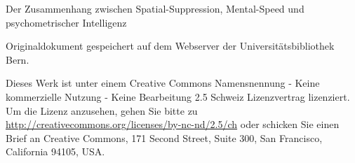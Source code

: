 \documentclass[11pt, twoside, a4paper]{book}		%
\begin{document}
\frontmatter		%


\begin{titlepage}
	\centering
		\huge Der Zusammenhang zwischen Spatial-Suppression, Mental-Speed und psychometrischer Intelligenz 
	\noindent\makebox[\textwidth]{\rule{\textwidth}{0.4pt}}
	
	\vspace{1cm}
	

		\vspace*{\fill}
		\small
	\flushleft Originaldokument gespeichert auf dem Webserver der Universitätsbibliothek Bern.

	\vspace{.2cm}
	\vspace{0cm}

	\RaggedRight Dieses Werk ist unter einem Creative Commons Namensnennung - Keine kommerzielle Nutzung - Keine Bearbeitung 2.5 Schweiz Lizenzvertrag lizenziert. Um die Lizenz anzusehen, gehen Sie bitte zu \url{http://creativecommons.org/licenses/by-nc-nd/2.5/ch} oder schicken Sie einen Brief an Creative Commons, 171 Second Street, Suite 300, San Francisco, California 94105, USA.



\end{titlepage}
\end{document}
